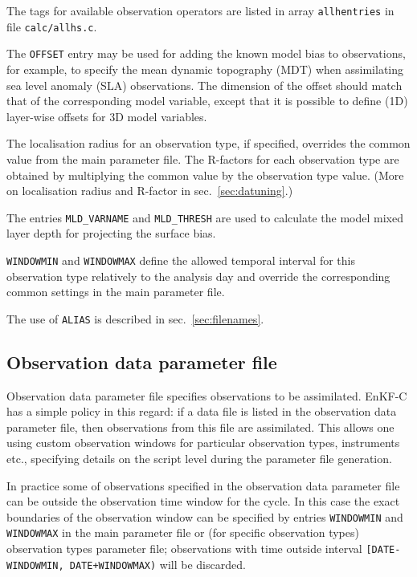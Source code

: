 \documentclass[11pt]{report}
\begin{document}
The tags for available observation operators are listed in array \verb|allhentries| in file \verb|calc/allhs.c|.

The \verb|OFFSET| entry may be used for adding the known model bias to observations, for example, to specify the mean dynamic topography (MDT) when assimilating sea level anomaly (SLA) observations.
The dimension of the offset should match that of the corresponding model variable, except that it is possible to define (1D) layer-wise offsets for 3D model variables.

The localisation radius for an observation type, if specified, overrides the
common value from the main parameter file.
The R-factors for each observation type are obtained by multiplying the common
value by the observation type value.
(More on localisation radius and R-factor in sec.~\ref{sec:datuning}.)

The entries \verb|MLD_VARNAME| and \verb|MLD_THRESH| are used to calculate the model mixed layer depth for projecting the surface bias.

\verb|WINDOWMIN| and \verb|WINDOWMAX| define the allowed temporal interval for this observation type relatively to the analysis day and override the corresponding common settings in the main parameter file.

The use of \verb|ALIAS| is described in sec.~\ref{sec:filenames}.

\subsection{Observation data parameter file}

Observation data parameter file specifies observations to be assimilated.
EnKF-C has a simple policy in this regard: if a data file is listed in the observation data parameter file, then observations from this file are assimilated.
This allows one using custom observation windows for particular observation types, instruments etc., specifying details on the script level during the parameter file generation.

In practice some of observations specified in the observation data parameter file can be outside the observation time window for the cycle.
In this case the exact boundaries of the observation window can be specified by entries \verb|WINDOWMIN| and \verb|WINDOWMAX| in the main parameter file or (for specific observation types) observation types parameter file;
observations with time outside interval \verb|[DATE-WINDOWMIN, DATE+WINDOWMAX)| will be discarded.
\end{document}
